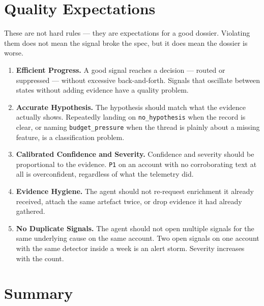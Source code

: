 \documentclass[11pt, a4paper]{article}
\begin{document}
\section{Quality Expectations}
\label{sec:quality}

These are not hard rules --- they are expectations for a good dossier. Violating them does not mean the signal broke the spec, but it does mean the dossier is worse.

\begin{enumerate}[leftmargin=*, label=\textbf{Q\arabic*.}]

\item \textbf{Efficient Progress.}
A good signal reaches a decision --- routed or suppressed --- without excessive back-and-forth. Signals that oscillate between states without adding evidence have a quality problem.

\item \textbf{Accurate Hypothesis.}
The hypothesis should match what the evidence actually shows. Repeatedly landing on \texttt{no\_hypothesis} when the record is clear, or naming \texttt{budget\_pressure} when the thread is plainly about a missing feature, is a classification problem.

\item \textbf{Calibrated Confidence and Severity.}
Confidence and severity should be proportional to the evidence. \texttt{P1} on an account with no corroborating text at all is overconfident, regardless of what the telemetry did.

\item \textbf{Evidence Hygiene.}
The agent should not re-request enrichment it already received, attach the same artefact twice, or drop evidence it had already gathered.

\item \textbf{No Duplicate Signals.}
The agent should not open multiple signals for the same underlying cause on the same account. Two open signals on one account with the same detector inside a week is an alert storm. Severity increases with the count.

\end{enumerate}

\section{Summary}
\label{sec:summary}
\end{document}
